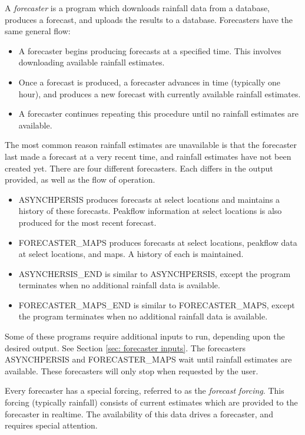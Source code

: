 \documentclass[12pt]{article}
\begin{document}
A \emph{forecaster} is a program which downloads rainfall data from a database, produces a forecast, and uploads the results to a database. Forecasters have the same general flow:
\begin{itemize}
 \item A forecaster begins producing forecasts at a specified time. This involves downloading available rainfall estimates.
 \item Once a forecast is produced, a forecaster advances in time (typically one hour), and produces a new forecast with currently available rainfall estimates.
 \item A forecaster continues repeating this procedure until no rainfall estimates are available.
\end{itemize}
The most common reason rainfall estimates are unavailable is that the forecaster last made a forecast at a very recent time, and rainfall estimates have not been created yet. There are four different forecasters. Each differs in the output provided, as well as the flow of operation.
\begin{itemize}
 \item ASYNCHPERSIS produces forecasts at select locations and maintains a history of these forecasts. Peakflow information at select locations is also produced for the most recent forecast.
 \item FORECASTER\_MAPS produces forecasts at select locations, peakflow data at select locations, and maps. A history of each is maintained.
 \item ASYNCHERSIS\_END is similar to ASYNCHPERSIS, except the program terminates when no additional rainfall data is available.
 \item FORECASTER\_MAPS\_END is similar to FORECASTER\_MAPS, except the program terminates when no additional rainfall data is available.
\end{itemize}
Some of these programs require additional inputs to run, depending upon the desired output. See Section \ref{sec: forecaster inputs}. The forecasters ASYNCHPERSIS and FORECASTER\_MAPS wait until rainfall estimates are available. These forecasters will only stop when requested by the user.

Every forecaster has a special forcing, referred to as the \emph{forecast forcing}. This forcing (typically rainfall) consists of current estimates which are provided to the forecaster in realtime. The availability of this data drives a forecaster, and requires special attention.
\end{document}
